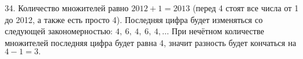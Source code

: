 34. Количество множителей равно $2012+1=2013$ (перед 4 стоят все числа от 1 до 2012, а также есть просто 4). Последняя цифра будет изменяться со следующей закономерностью: $4,\ 6,\ 4,\ 6,\ 4,\ldots$ При нечётном количестве множителей последняя цифра будет равна 4, значит разность будет кончаться на $4-1=3.$\\
